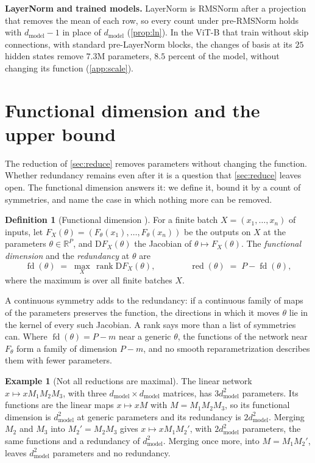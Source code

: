 \documentclass[10pt]{article}
\theoremstyle{definition}
\newtheorem{definition}[theorem]{Definition}
\newtheorem{example}[theorem]{Example}
\theoremstyle{remark}
\newcommand{\R}{\mathbb{R}}
\newcommand{\dm}{d_{\mathrm{model}}}
\newcommand{\Der}{\mathrm{D}}
\newcommand{\para}[1]{\smallskip\noindent\textbf{#1}\hspace{0.5em}}
\begin{document}
\para{LayerNorm and trained models.}\label{sec:trained} LayerNorm is RMSNorm after a projection that removes the mean of each row, so every count under pre-RMSNorm holds with $\dm - 1$ in place of $\dm$ (\cref{prop:ln}). In the ViT-B \citep{dosovitskiy2021an} that \citet{ji2026cutting} train without skip connections, with standard pre-LayerNorm blocks, the changes of basis at its $25$ hidden states remove $7.3$M parameters, $8.5$ percent of the model, without changing its function (\cref{app:scale}).

\section{Functional dimension and the upper bound}\label{sec:sym}\label{sec:count}

The reduction of \cref{sec:reduce} removes parameters without changing the function. Whether redundancy remains even after it is a question that \cref{sec:reduce} leaves open. The functional dimension answers it: we define it, bound it by a count of symmetries, and name the case in which nothing more can be removed.

\begin{definition}[Functional dimension {\citep{grigsby2022functional}}]\label{def:fd}
For a finite batch $X = (x_1, \dots, x_n)$ of inputs, let $F_X(\theta) = (F_\theta(x_1), \dots, F_\theta(x_n))$ be the outputs on $X$ at the parameters $\theta \in \R^P$, and $\Der F_X(\theta)$ the Jacobian of $\theta \mapsto F_X(\theta)$. The \emph{functional dimension} and the \emph{redundancy} at $\theta$ are
\[
\operatorname{fd}(\theta) \;=\; \max_{X}\, \operatorname{rank} \Der F_X(\theta), \qquad\qquad \operatorname{red}(\theta) \;=\; P - \operatorname{fd}(\theta),
\]
where the maximum is over all finite batches $X$.
\end{definition}

A continuous symmetry adds to the redundancy: if a continuous family of maps of the parameters preserves the function, the directions in which it moves $\theta$ lie in the kernel of every such Jacobian. A rank says more than a list of symmetries can. Where $\operatorname{fd}(\theta) = P - m$ near a generic $\theta$, the functions of the network near $F_\theta$ form a family of dimension $P - m$, and no smooth reparametrization describes them with fewer parameters.

\begin{example}[Not all reductions are maximal]\label{ex:three}
The linear network $x \mapsto xM_1M_2M_3$, with three $\dm\times\dm$ matrices, has $3\dm^2$ parameters. Its functions are the linear maps $x \mapsto xM$ with $M = M_1M_2M_3$, so its functional dimension is $\dm^2$ at generic parameters and its redundancy is $2\dm^2$. Merging $M_2$ and $M_3$ into $M_2' = M_2M_3$ gives $x \mapsto xM_1M_2'$, with $2\dm^2$ parameters, the same functions and a redundancy of $\dm^2$. Merging once more, into $M = M_1M_2'$, leaves $\dm^2$ parameters and no redundancy.
\end{example}
\end{document}
